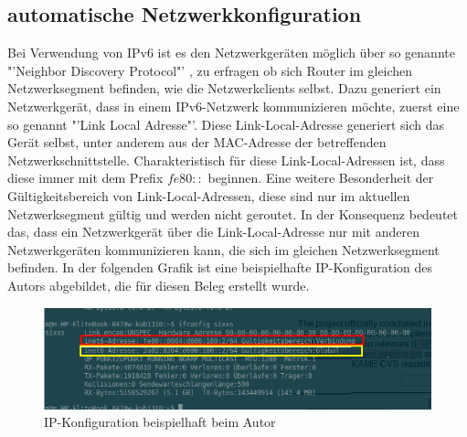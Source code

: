 \documentclass[a4paper,12pt]{scrartcl}
\begin{document}
\subsection{automatische Netzwerkkonfiguration}
Bei Verwendung von IPv6 ist es den Netzwerkger\"aten m\"oglich \"uber so genannte "'Neighbor Discovery Protocol"'  \cite[RFC3122]{RFC3122},  \cite[RFC4861]{RFC4861} zu erfragen ob sich Router im gleichen Netzwerksegment befinden, wie die Netzwerkclients selbst. Dazu generiert ein Netzwerkger\"at, dass in einem IPv6-Netzwerk kommunizieren m\"ochte, zuerst eine so genannt "'Link Local Adresse"'. Diese Link-Local-Adresse generiert sich das Ger\"at selbst, unter anderem aus der MAC-Adresse der betreffenden Netzwerkschnittstelle. Charakteristisch f\"ur diese Link-Local-Adressen ist, dass diese immer mit dem Prefix $fe80::$ beginnen. Eine weitere Besonderheit der G\"ultigkeitsbereich von Link-Local-Adressen, diese sind nur im aktuellen Netzwerksegment g\"ultig und werden nicht geroutet. In der Konsequenz bedeutet das, dass ein Netzwerkger\"at \"uber die Link-Local-Adresse nur mit anderen Netzwerkger\"aten kommunizieren kann, die sich im gleichen Netzwerksegment befinden. In der folgenden Grafik ist eine beispielhafte IP-Konfiguration des Autors abgebildet, die f\"ur diesen Beleg erstellt wurde.

\begin{figure}[htb]
\begin{center}
 \includegraphics[width=1\hsize]{./images/ifconfig.png}
 \end{center}
\caption[IP-Konfiguration beispielhaft beim Autor, Quelle: Autor,]{\label{ifconfig}IP-Konfiguration beispielhaft beim Autor}
\end{figure}
\end{document}
